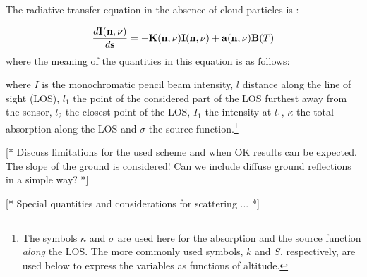 The radiative transfer equation in the absence of cloud particles is
\citep{mishchenko00:_light_scatt_nonsp_partic}: 

\begin{equation}
  \label{eq:rte_4stokes_no_scat}
  \frac{d{\bf I}({\bf n},\nu)}{d{\bf s}} = - {\bf K}({\bf n},\nu) {\bf I}({\bf n},\nu) + {\bf a}({\bf n},\nu){\bf B}(T)
\end{equation}
where the meaning of the quantities in this equation is as follows:




 where $I$ is the monochromatic pencil beam intensity, $l$ distance
 along the line of sight (LOS), $l_1$ the point of the considered part
 of the LOS furthest away from the sensor, $l_2$ the closest point of
 the LOS, $I_1$ the intensity at $l_1$, $\kappa$ the total absorption
 along the LOS and $\sigma$ the source function.\footnote{The symbols
   $\kappa$ and $\sigma$ are used here for the absorption and the source 
   function \emph{along} the LOS. The more commonly used symbols, $k$ and
   $S$, respectively, are used below to express the variables as
   functions of altitude.}


\label{sec:fm_defs:groundrefl}

[* Discuss limitations for the used scheme and when OK results can be
expected. The slope of the ground is considered! Can we include
diffuse ground reflections in a simple way? *]



\label{sec:fm_defs:scattering}

[* Special quantities and considerations for scattering ... *]


